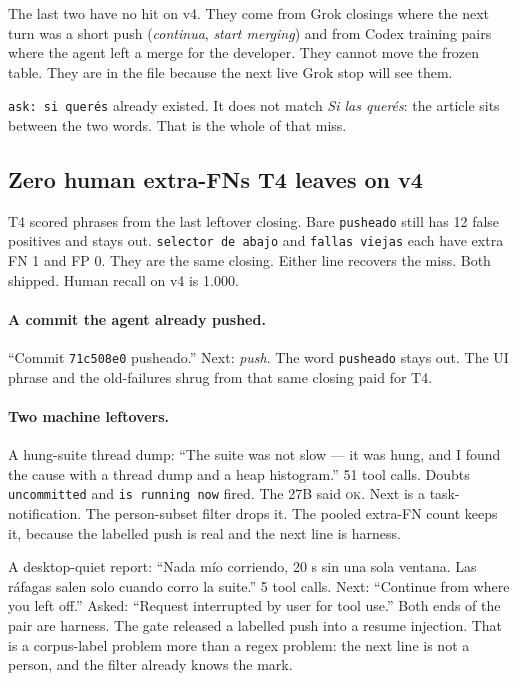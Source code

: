 The last two have no hit on v4. They come from Grok closings where
the next turn was a short push (\emph{continua}, \emph{start merging})
and from Codex training pairs where the agent left a merge for the
developer. They cannot move the frozen table. They are in the file
because the next live Grok stop will see them.

\texttt{ask: si quer\'es} already existed. It does not match
\emph{Si las quer\'es}: the article sits between the two words.
That is the whole of that miss.

\subsection{Zero human extra-FNs T4 leaves on v4}
\label{sec:remain}

T4 scored phrases from the last leftover closing. Bare
\texttt{pusheado} still has 12 false positives and stays out.
\texttt{selector de abajo} and \texttt{fallas viejas} each have
extra FN 1 and FP 0. They are the same closing. Either line recovers
the miss. Both shipped. Human recall on v4 is 1.000.

\paragraph{A commit the agent already pushed.}
``Commit \texttt{71c508e0} pusheado.'' Next: \emph{push}. The word
\texttt{pusheado} stays out. The UI phrase and the old-failures
shrug from that same closing paid for T4.

\paragraph{Two machine leftovers.}
A hung-suite thread dump: ``The suite was not slow --- it was hung,
and I found the cause with a thread dump and a heap histogram.''
51 tool calls. Doubts \texttt{uncommitted} and \texttt{is running
now} fired. The 27B said \textsc{ok}. Next is a task-notification.
The person-subset filter drops it. The pooled extra-FN count keeps
it, because the labelled push is real and the next line is harness.

A desktop-quiet report: ``Nada m\'io corriendo, 20 s sin una sola
ventana. Las r\'afagas salen solo cuando corro la suite.'' 5 tool
calls. Next: ``Continue from where you left off.'' Asked: ``Request
interrupted by user for tool use.'' Both ends of the pair are
harness. The gate released a labelled push into a resume injection.
That is a corpus-label problem more than a regex problem: the next
line is not a person, and the filter already knows the mark.

